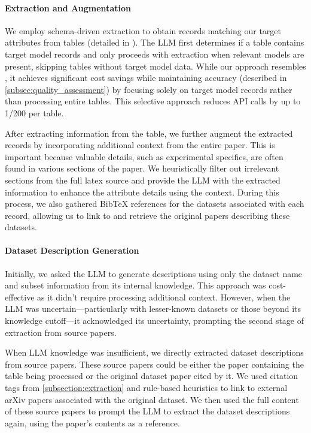 \paragraph{Extraction and Augmentation}

We employ schema-driven extraction to obtain records matching our target attributes from tables (detailed in ). 
The LLM first determines if a table contains target model records and only proceeds with extraction when relevant models are present, skipping tables without target model data.
While our approach resembles \citet{bai2023schema}, it achieves significant cost savings while maintaining accuracy (described in \cref{subsec:quality_assessment}) by focusing solely on target model records rather than processing entire tables. 
This selective approach reduces API calls by up to 1/200 per table.

After extracting information from the table, we further augment the extracted records by incorporating additional context from the entire paper. 
This is important because valuable details, such as experimental specifics, are often found in various sections of the paper. 
We heuristically filter out irrelevant sections from the full latex source and provide the LLM with the extracted information to enhance the attribute details using the context. 
During this process, we also gathered BibTeX references for the datasets associated with each record, allowing us to link to and retrieve the original papers describing these datasets.



\paragraph{Dataset Description Generation}

Initially, we asked the LLM to generate descriptions using only the dataset name and subset information from its internal knowledge. 
This approach was cost-effective as it didn't require processing additional context. 
However, when the LLM was uncertain—particularly with lesser-known datasets or those beyond its knowledge cutoff—it acknowledged its uncertainty, prompting the second stage of extraction from source papers.

When LLM knowledge was insufficient, we directly extracted dataset descriptions from source papers. 
These source papers could be either the paper containing the table being processed or the original dataset paper cited by it. 
We used citation tags from \cref{subsection:extraction} and rule-based heuristics to link to external arXiv papers associated with the original dataset.
We then used the full content of these source papers to prompt the LLM to extract the dataset descriptions again, using the paper’s contents as a reference.

